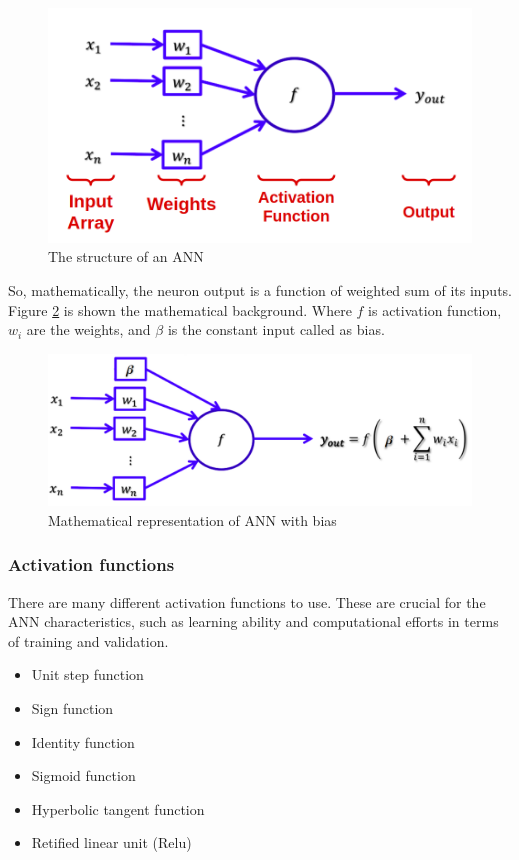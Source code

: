 \begin{figure}[H]
\centering
\includegraphics[width=\columnwidth]{imagens/ann.png}
\caption{The structure of an ANN}
\label{fig:ann}
\end{figure}

So, mathematically, the neuron output is a function of weighted sum of its inputs. Figure \ref{fig:ann_weight} is shown the mathematical background. Where $f$ is activation function, $w_i$ are the weights, and $\beta$ is the constant input called as bias.


\begin{figure}[H]
\centering
\includegraphics[width=\columnwidth]{imagens/math_ann_bias.png}
\caption{Mathematical representation of ANN with bias}
\label{fig:ann_weight}
\end{figure}


\subsubsection{Activation functions}
There are many different activation functions to use. These are crucial for the ANN characteristics, such as learning ability and computational efforts in terms of training and validation.

\begin{itemize}
    \item Unit step function
    \item Sign function
    \item Identity function
    \item Sigmoid function
    \item Hyperbolic tangent function
    \item Retified linear unit (Relu) 
\end{itemize}

